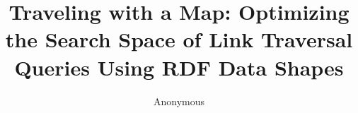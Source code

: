 \documentclass[runningheads]{llncs}
\newif\ifanonymous
\begin{document}
\anonymoustrue

%
\title{Traveling with a Map: Optimizing the Search Space of Link Traversal Queries Using RDF Data Shapes}
%
%
\ifanonymous
    \author{Anonymous}
\else
    \author{Bryan-Elliott Tam\inst{1}\orcidID{0000-0003-3467-9755} \and
    Ruben Taelman\inst{1}\orcidID{0000-0001-5118-256X} \and
    Pieter Colpaert\inst{1}\orcidID{0000-0001-6917-2167}}
    \authorrunning{B.-E. Tam et al.}
    \institute{Universiteit Gent, Ghent, Belgium \\
    \email{\{firstname.lastname\}@ugent.be}}
\fi


%
\maketitle              %
%












\printbibliography
\end{document}
